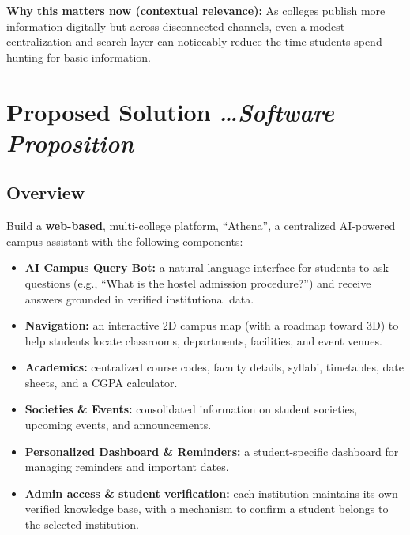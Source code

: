 \documentclass[11pt,a4paper]{article}
\newcommand{\BvrHint}[1]{%
  {\normalfont\normalsize\itshape\hfill #1}}
\begin{document}
\textbf{Why this matters now (contextual relevance):} As colleges publish more information digitally but across disconnected channels, even a modest centralization and search layer can noticeably reduce the time students spend hunting for basic information.

\section{Proposed Solution %
\BvrHint{\ldots Software Proposition}}
\subsection{Overview}
Build a \textbf{web-based}, multi-college platform, ``Athena'', a
centralized AI-powered campus assistant with the following components:
\begin{itemize}[leftmargin=0.7cm]
    \item \textbf{AI Campus Query Bot:} a natural-language interface for students to ask questions (e.g., ``What is the hostel admission procedure?'') and receive answers grounded in verified institutional data.
    \item \textbf{Navigation:} an interactive 2D campus map (with a roadmap toward 3D) to help students locate classrooms, departments, facilities, and event venues.
    \item \textbf{Academics:} centralized course codes, faculty details, syllabi, timetables, date sheets, and a CGPA calculator.
    \item \textbf{Societies \& Events:} consolidated information on student societies, upcoming events, and announcements.
    \item \textbf{Personalized Dashboard \& Reminders:} a student-specific dashboard for managing reminders and important dates.
    \item \textbf{Admin access \& student verification:} each institution maintains its own verified knowledge base, with a mechanism to confirm a student belongs to the selected institution.
\end{itemize}
\end{document}
